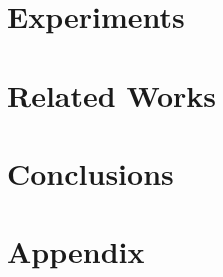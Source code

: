 \documentclass[10pt]{article}
\begin{document}
\newpage
\section{Experiments}
    \label{sec:experiments}
    
    
\section{Related Works}
    \label{sec:related}
        

\section{Conclusions}
    \label{sec:conclusions}
    





\newpage
\appendix
\section{Appendix}

\end{document}
